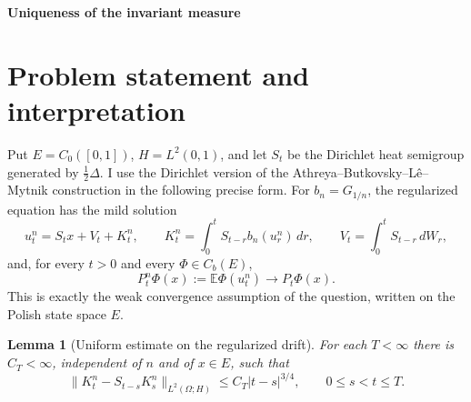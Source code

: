 \documentclass[12pt]{article}
\newtheorem{lemma}{Lemma}
\newcommand{\E}{\mathbb E}
\newcommand{\1}{\mathbf 1}
\begin{document}
\begin{center}
{\bf Uniqueness of the invariant measure}
\end{center}

\section*{Problem statement and interpretation}

Put \(E=C_0([0,1])\), \(H=L^2(0,1)\), and let \(S_t\) be the Dirichlet heat
semigroup generated by \(\frac12\Delta\).  I use the Dirichlet version of the
Athreya--Butkovsky--L\^e--Mytnik construction in the following precise form.
For \(b_n=G_{1/n}\), the regularized equation has the mild solution
\[
  u_t^n=S_t x+V_t+K_t^n,\qquad
  K_t^n=\int_0^tS_{t-r}b_n(u_r^n)\,dr,\qquad
  V_t=\int_0^tS_{t-r}\,dW_r ,
\]
and, for every \(t>0\) and every \(\Phi\in C_b(E)\),
\[
        P_t^n\Phi(x):=\E\Phi(u_t^n)\longrightarrow P_t\Phi(x).
        \tag{1}
\]
This is exactly the weak convergence assumption of the question, written on
the Polish state space \(E\).

\begin{lemma}[Uniform estimate on the regularized drift]\label{lem:Hestimate}
For each \(T<\infty\) there is \(C_T<\infty\), independent of \(n\) and of
\(x\in E\), such that
\[
 \|K_t^n-S_{t-s}K_s^n\|_{L^2(\Omega;H)}
      \le C_T |t-s|^{3/4},\qquad 0\le s<t\le T .             \tag{2}
\]
\end{lemma}
\end{document}
